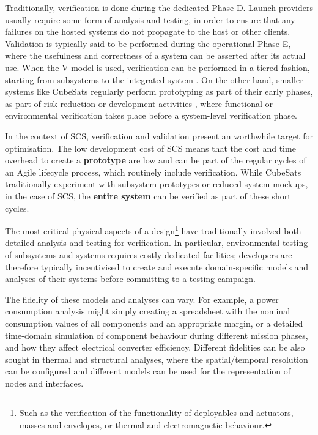 \documentclass[a4paper,nobib,justified,final]{tufte-book}
\begin{document}
Traditionally, verification is done during the dedicated Phase D. Launch providers usually require some form of analysis and testing, in order to ensure that any failures on the hosted systems do not propagate to the host or other clients.  Validation is typically said to be performed during the operational Phase E, where the usefulness and correctness of a system can be asserted after its actual use. When the V-model is used, verification can be performed in a tiered fashion, starting from subsystems to the integrated system \autocite{bundesrepublikdeutschlandVModellXT2006}. On the other hand, smaller systems like CubeSats regularly perform prototyping as part of their early phases, as part of risk-reduction or development activities \autocite{sousaCubeSatDevelopmentFramework2021,karvinenUsingHobbyPrototyping}, where functional or environmental verification takes place before a system-level verification phase.

In the context of \ac{SCS}, verification and validation present an worthwhile target for optimisation.
The low development cost of \ac{SCS} means that the cost and time overhead to create a \textbf{prototype} are low and can be part of the regular cycles of an Agile lifecycle process, which routinely include verification.
While CubeSats traditionally experiment with subsystem prototypes or reduced system mockups, in the case of \ac{SCS}, the \textbf{entire system} can be verified as part of these short cycles.

The most critical physical aspects of a design\footnote{Such as the verification of the functionality of deployables and actuators, masses and envelopes, or thermal and electromagnetic behaviour.} have traditionally involved both detailed analysis and testing for verification. In particular, environmental testing of subsystems and systems requires costly dedicated facilities; developers are therefore typically incentivised to create and execute domain-specific models and analyses of their systems before committing to a testing campaign.

The fidelity of these models and analyses can vary. For example, a power consumption analysis might simply creating a spreadsheet with the nominal consumption values of all components and an appropriate margin, or a detailed time-domain simulation of component behaviour during different mission phases, and how they affect electrical converter efficiency. Different fidelities can be also sought in thermal and structural analyses, where the spatial/temporal resolution can be configured and different models can be used for the representation of nodes and interfaces.
\end{document}
